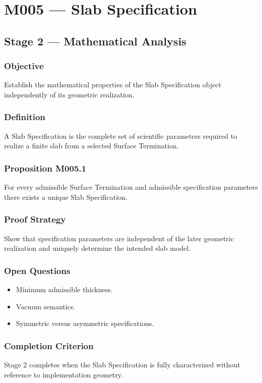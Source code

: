 \chapter{M005 --- Slab Specification}

\section{Stage 2 --- Mathematical Analysis}

\subsection{Objective}

Establish the mathematical properties of the Slab Specification object
independently of its geometric realization.

\subsection{Definition}

A Slab Specification is the complete set of scientific parameters
required to realize a finite slab from a selected Surface Termination.

\subsection{Proposition M005.1}

For every admissible Surface Termination and admissible specification
parameters there exists a unique Slab Specification.

\subsection{Proof Strategy}

Show that specification parameters are independent of the later
geometric realization and uniquely determine the intended slab model.

\subsection{Open Questions}

\begin{itemize}
\item Minimum admissible thickness.
\item Vacuum semantics.
\item Symmetric versus asymmetric specifications.
\end{itemize}

\subsection{Completion Criterion}

Stage 2 completes when the Slab Specification is fully characterized
without reference to implementation geometry.
